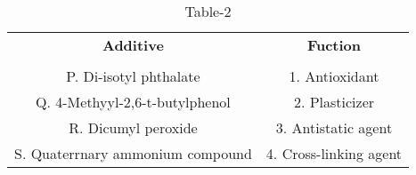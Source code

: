 \begin{table}[htbp]
  \centering
  \caption{Table-2}
  \label{table2}
  \begin{tabular}{cc}
  \textbf{Additive} & \textbf{Fuction} \\ \\
    P. Di-isotyl phthalate & 1. Antioxidant \\
    Q. 4-Methyyl-2,6-t-butylphenol & 2. Plasticizer \\
    R. Dicumyl peroxide & 3. Antistatic agent \\
    S. Quaterrnary ammonium compound & 4. Cross-linking agent \\
  \end{tabular}
\end{table}